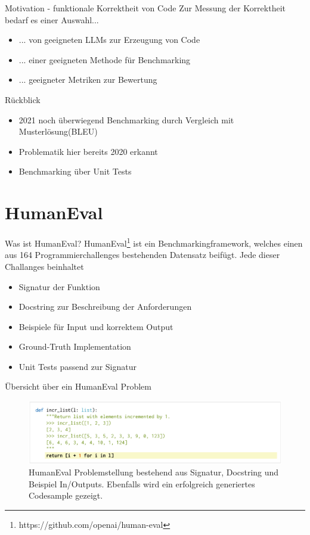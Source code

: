 \documentclass{beamer}              %
\begin{document}
\begin{frame}{Motivation - funktionale Korrektheit von Code}
Zur Messung der Korrektheit bedarf es einer Auswahl...
\begin{itemize}
    \item ... von geeigneten LLMs zur Erzeugung von Code
    \item ... einer geeigneten Methode für Benchmarking
    \item ... geeigneter Metriken zur Bewertung
\end{itemize}
\end{frame}

\begin{frame}{Rückblick}
\begin{itemize}
    \item 2021 noch überwiegend Benchmarking durch Vergleich mit Musterlösung(BLEU)\cite{chen2021evaluating}
    \item Problematik hier bereits 2020 erkannt\cite{ren2020codebleu}
    \item Benchmarking über Unit Tests\cite{osti_10195511}\cite{chen2021evaluating}
\end{itemize}
\end{frame}

\section{HumanEval}
\begin{frame}{Was ist HumanEval?}
HumanEval\footnote{https://github.com/openai/human-eval} ist ein Benchmarkingframework, welches einen aus 164 Programmierchallenges bestehenden Datensatz beifügt\cite{chen2021evaluating}. Jede dieser Challanges beinhaltet
\begin{itemize}
    \item Signatur der Funktion
    \item Docstring zur Beschreibung der Anforderungen
    \item Beispiele für Input und korrektem Output
    \item Ground-Truth Implementation
    \item Unit Tests passend zur Signatur
\end{itemize}
\end{frame}

\begin{frame}{Übersicht über ein HumanEval Problem}
    \begin{figure}
        \centering
        \includegraphics[width=0.8\paperwidth]{images/humanevalproblem.png}
        \caption{HumanEval Problemstellung bestehend aus Signatur, Docstring und Beispiel In/Outputs.           Ebenfalls wird ein erfolgreich generiertes Codesample gezeigt.\cite{chen2021evaluating}}
    \end{figure}
\end{frame}
\end{document}

